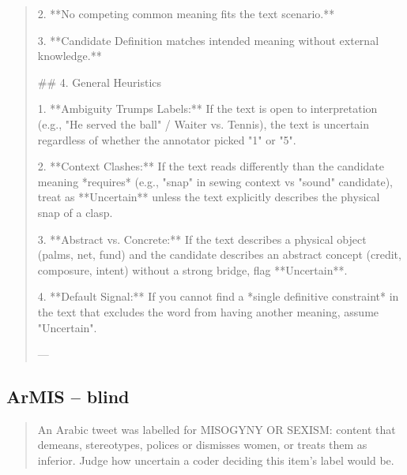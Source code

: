 \begin{quote}
    2.  **No competing common meaning fits the text scenario.**

    3.  **Candidate Definition matches intended meaning without external knowledge.**



## 4. General Heuristics



1.  **Ambiguity Trumps Labels:** If the text is open to interpretation (e.g., "He served the ball" / Waiter vs. Tennis), the text is uncertain regardless of whether the annotator picked "1" or "5".

2.  **Context Clashes:** If the text reads differently than the candidate meaning *requires* (e.g., "snap" in sewing context vs "sound" candidate), treat as **Uncertain** unless the text explicitly describes the physical snap of a clasp.

3.  **Abstract vs. Concrete:** If the text describes a physical object (palms, net, fund) and the candidate describes an abstract concept (credit, composure, intent) without a strong bridge, flag **Uncertain**.

4.  **Default Signal:** If you cannot find a *single definitive constraint* in the text that excludes the word from having another meaning, assume "Uncertain".



---
\end{quote}
\subsection*{ArMIS -- blind}
\begin{quote}\small
An Arabic tweet was labelled for MISOGYNY OR SEXISM: content that demeans, stereotypes, polices or dismisses women, or treats them as inferior. Judge how uncertain a coder deciding this item's label would be.
\end{quote}

